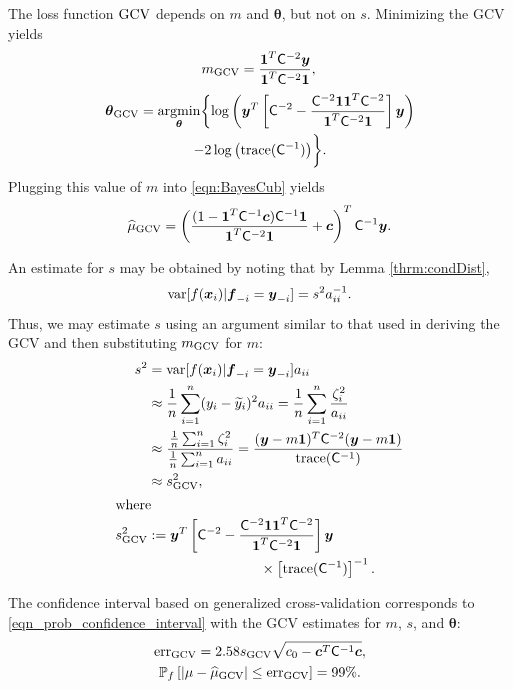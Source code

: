 \documentclass[twocolumn]{svjour3}          %
\newcommand{\bm}[1]{\boldsymbol{#1}}
\newcommand{\trace}[1]{\textup{trace}{#1}}
\newcommand{\vtheta}{{\bm{\theta}}}
\newcommand{\vc}{\bm{c}}
\newcommand{\vf}{\bm{f}}
\newcommand{\vx}{\bm{x}}
\newcommand{\vy}{\bm{y}}
\newcommand{\vone}{\bm{1}}
\newcommand{\mC}{\mathsf{C}}
\newcommand{\var}{{\textup{var}}}
\newcommand{\hmu}{\widehat{\mu}}
\newcommand{\err}{\textup{err}}
\providecommand{\argmin}{\operatorname*{argmin}}
\begin{document}
The loss function $\textup{GCV}$ depends on $m$ and $\vtheta$, but not on $s$.  Minimizing the GCV  yields
\begin{equation*}
m_{\textup{GCV}} = \frac{\vone^T \mC^{-2} \vy}{\vone^T \mC^{-2} \vone},\\ 
\end{equation*}
\begin{multline}
\label{vthetaGCV}
\vtheta_{\textup{GCV}} = \argmin_\vtheta \biggl\{\log \left(  \vy^T \left[\mC^{-2} - \frac{\mC^{-2} \vone \vone^T \mC^{-2}}{\vone^T \mC^{-2} \vone}  \right] \vy \right)  \\
- 2 \log \left ( \trace(\mC^{-1}) \right ) \biggr\} .
\end{multline}
Plugging this value of $m$ into \eqref{eqn:BayesCub} yields
\begin{equation}
\label{eqn:muCV}
\widehat{\mu}_{\textup{GCV}}
= \left(\frac{(1 - \vone^T  \mC^{-1}\vc) \mC^{-1} \vone}{\vone^T \mC^{-2} \vone} + \vc \right)^T \mC^{-1} \vy.
\end{equation}

An estimate for $s$ may be obtained by noting that by Lemma \ref{thrm:condDist},
\[
\var[f(\vx_i ) | \vf_{-i} = \vy_{-i}] = s^2 a_{ii}^{-1}.
\]
Thus, we may estimate $s$ using an argument similar to that used in deriving the GCV and then substituting $m_{\textup{GCV}}$ for $m$:
\begin{align*}
s^2 &= \var[f(\vx_i ) | \vf_{-i} = \vy_{-i}] a_{ii} \\ 
& \approx \frac 1n \sum_{i=1}^n (y_i - \widetilde{y}_i)^2a_{ii}
 = \frac 1n \sum_{i=1}^n \frac{\zeta_i^2}{a_{ii}} \\ 
 & \approx \frac{ \frac 1n \sum_{i=1}^n \zeta_i^2}{\frac 1n \sum_{i=1}^n a_{ii} } = \frac{(\vy - m\vone)^T \mC^{-2} (\vy - m \vone)}{ \trace(\mC^{-1}) } \\ 
 & \approx  s^2_{\textup{GCV}}, \\
 \intertext{where}
 s^2_{\textup{GCV}} & : = \vy^T \left[\mC^{-2} - \frac{\mC^{-2} \vone \vone^T \mC^{-2}}{\vone^T \mC^{-2} \vone}  \right] \vy \\
 &\qquad \qquad  \qquad \qquad  \times \left[ \trace(\mC^{-1}) \right]^{-1}. 
\end{align*}

The confidence interval based on generalized cross-validation corresponds to \eqref{eqn_prob_confidence_interval} with the GCV estimates for $m$, $s$, and $\vtheta$:
\begin{gather}
\label{GCVerr}
\err_{\textup{GCV}} = 2.58 s_{\textup{GCV}}  \sqrt{c_0 - \vc^T\mC^{-1}\vc}, \\
\label{GCVCI}
\mathbb{P}_f \left[
|\mu-\hmu_{\textup{GCV}}| \leq \err_{\textup{GCV}} 
\right] = 99\%.
\end{gather}
\end{document}
